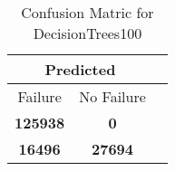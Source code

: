 \begin{table}[] 
\caption{Confusion Matric for DecisionTrees100} 
\label{Table: Prediction Accuracy-DMDDecisionTrees100OnlySunEKF-resetReflectionperfectNoFailurePrediction-Reflection} 
\centering 
\begin{tabular} 
 {@{}ccc@{}} 
\toprule 
\multicolumn{2}{c}{\textbf{Predicted}}
 \\ \midrule 
\multicolumn{1}{|c|}{Failure} & 
\multicolumn{1}{c|}{No Failure}
 \\ \midrule 
\multicolumn{1}{|c|}{\color{green}\textbf{125938}} & 
\multicolumn{1}{c|}{\color{red}\textbf{0}}
 \\ \midrule 
\multicolumn{1}{|c|}{\color{red}\textbf{16496}} & 
\multicolumn{1}{c|}{\color{green}\textbf{27694}}
 \\ \bottomrule 
\end{tabular} 
\end{table} 
